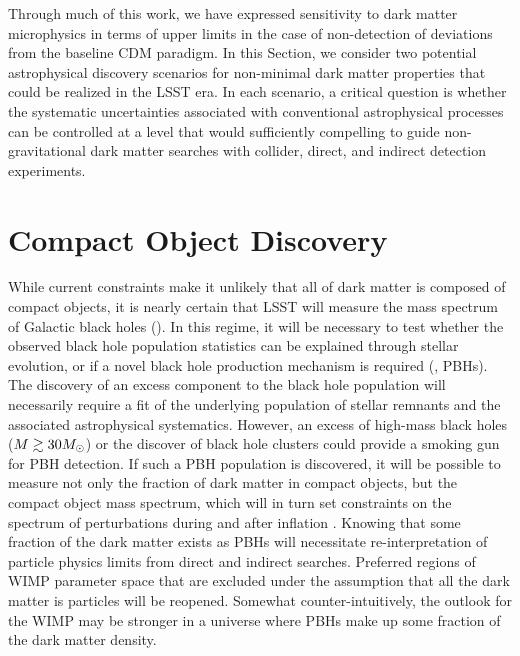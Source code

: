 
Through much of this work, we have expressed sensitivity to dark matter microphysics in terms of upper limits in the case of non-detection of deviations from the baseline CDM paradigm.
In this Section, we consider two potential astrophysical discovery scenarios for non-minimal dark matter properties that could be realized in the LSST era.
In each scenario, a critical question is whether the systematic uncertainties associated with conventional astrophysical processes can be controlled at a level that would sufficiently compelling to guide non-gravitational dark matter searches with collider, direct, and indirect detection experiments.

\section{Compact Object Discovery}

While current constraints make it unlikely that all of dark matter is composed of compact objects, it is nearly certain that LSST will measure the mass spectrum of Galactic black holes ().
In this regime, it will be necessary to test whether the observed black hole population statistics can be explained through stellar evolution, or if a novel black hole production mechanism is required (\ie, PBHs).
The discovery of an excess component to the black hole population will necessarily require a fit of the underlying population of stellar remnants and the associated astrophysical systematics. 
However, an excess of high-mass black holes ($M \gtrsim 30M_\odot$) or the discover of black hole clusters \citep[\eg][]{1603.05234} could provide a smoking gun for PBH detection.
If such a PBH population is discovered, it will be possible to measure not only the fraction of dark matter in compact objects, but the compact object mass spectrum, which will in turn set constraints on the spectrum of perturbations during and after inflation \citep[\eg][]{1702.03901}.
Knowing that some fraction of the dark matter exists as PBHs will necessitate re-interpretation of particle physics limits from direct and indirect searches.
Preferred regions of WIMP parameter space that are excluded under the assumption that all the dark matter is particles will be reopened.
Somewhat counter-intuitively, the outlook for the WIMP may be stronger in a universe where PBHs make up some fraction of the dark matter density.

